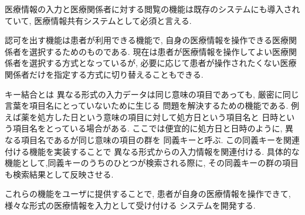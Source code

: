 医療情報の入力と医療関係者に対する閲覧の機能は既存のシステムにも導入されていて,
医療情報共有システムとして必須と言える.

認可を出す機能は患者が利用できる機能で,
自身の医療情報を操作できる医療関係者を選択するためのものである.
現在は患者が医療情報を操作してよい医療関係者を選択する方式となっているが,
必要に応じて患者が操作されたくない医療関係者だけを指定する方式に切り替えることもできる.

キー結合とは
異なる形式の入力データは同じ意味の項目であっても,
厳密に同じ言葉を項目名にとっていないために生じる
問題を解決するための機能である.
例えば薬を処方した日という意味の項目に対して処方日という項目名と
日時という項目名をとっている場合がある.
ここでは便宜的に処方日と日時のように,
異なる項目名であるが同じ意味の項目の群を
同義キーと呼ぶ.
この同義キーを関連付ける機能を実装することで
異なる形式からの入力情報を関連付ける.
具体的な機能として,同義キーのうちのひとつが検索される際に,
その同義キーの群の項目も検索結果として反映させる.

これらの機能をユーザに提供することで,
患者が自身の医療情報を操作できて,
様々な形式の医療情報を入力として受け付ける
システムを開発する.
